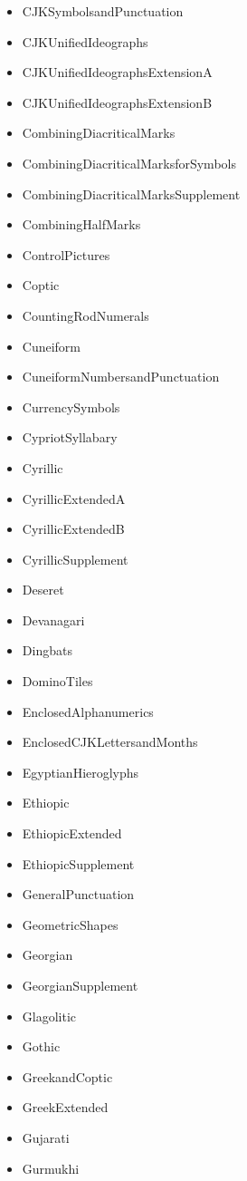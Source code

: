 ﻿\documentclass{article}
\newenvironment{itemlist}{%
  \begin{itemize}
	\setlength{\itemsep}{0pt}
	\setlength{\parsep}{0pt}
	\setlength{\topsep}{0pt}
	\setlength{\partopsep}{0pt}
	\setlength{\parskip}{0pt}
	\setlength{\labelsep}{5pt}}%
{
  \end{itemize}}
\begin{document}
\begin{multicols}{2}
\begin{itemlist}
				\item CJKSymbolsandPunctuation
				\item CJKUnifiedIdeographs
				\item CJKUnifiedIdeographsExtensionA
				\item CJKUnifiedIdeographsExtensionB
				\item CombiningDiacriticalMarks
				\item CombiningDiacriticalMarksforSymbols
				\item CombiningDiacriticalMarksSupplement
				\item CombiningHalfMarks
				\item ControlPictures
				\item Coptic
				\item CountingRodNumerals
				\item Cuneiform
				\item CuneiformNumbersandPunctuation
				\item CurrencySymbols
				\item CypriotSyllabary
				\item Cyrillic
				\item CyrillicExtendedA
				\item CyrillicExtendedB
				\item CyrillicSupplement
				\item Deseret
				\item Devanagari
				\item Dingbats
				\item DominoTiles
				\item EnclosedAlphanumerics
				\item EnclosedCJKLettersandMonths
				\item EgyptianHieroglyphs
				\item Ethiopic
				\item EthiopicExtended
				\item EthiopicSupplement
				\item GeneralPunctuation
				\item GeometricShapes
				\item Georgian
				\item GeorgianSupplement
				\item Glagolitic
				\item Gothic
				\item GreekandCoptic
				\item GreekExtended
				\item Gujarati
				\item Gurmukhi

\end{itemlist}
\end{multicols}
\end{document}
